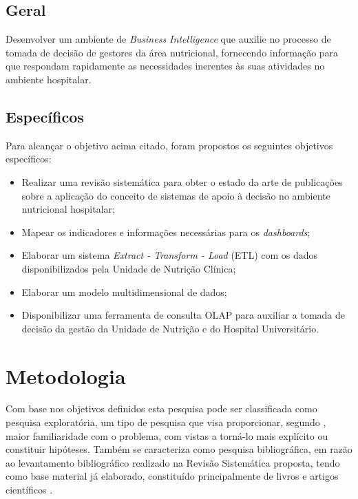 \subsection{Geral}\label{sec-divisoes-subsection}
Desenvolver um ambiente de \textit{Business Intelligence} que auxilie no processo de tomada de decisão de gestores da área nutricional, fornecendo informação para que respondam rapidamente as necessidades inerentes às suas atividades no ambiente hospitalar.

\subsection{Específicos}\label{sec-divisoes-subsection}
Para alcançar o objetivo acima citado, foram propostos os seguintes objetivos específicos:
\begin{itemize}
 \item Realizar uma revisão sistemática para obter o estado da arte de publicações sobre a aplicação do conceito de sistemas de apoio à decisão no ambiente nutricional hospitalar;

 \item Mapear os indicadores e informações necessárias para os \textit{dashboards};

 \item Elaborar um sistema \textit{Extract - Transform - Load} (ETL) com os dados disponibilizados pela Unidade de Nutrição Clínica;
 
 \item Elaborar um modelo multidimensional de dados;
 
 \item Disponibilizar uma ferramenta de consulta OLAP para auxiliar a tomada de decisão da gestão da Unidade de Nutrição e do Hospital Universitário.
\end{itemize}

\section{Metodologia}\label{sec-divisoes}
Com base nos objetivos definidos esta pesquisa pode ser classificada como pesquisa exploratória, um tipo de pesquisa que visa proporcionar, segundo , maior familiaridade com o problema, com vistas a torná-lo mais explícito ou constituir hipóteses.
Também se caracteriza como pesquisa bibliográfica, em razão ao levantamento bibliográfico realizado na Revisão Sistemática proposta, tendo como base material já elaborado, constituído principalmente de livros e artigos científicos \cite{gil2002}.

